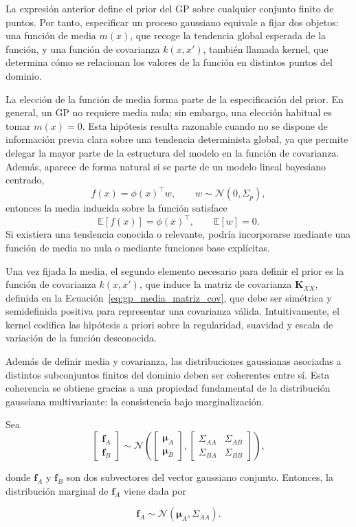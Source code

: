 \noindent La expresión anterior define el prior del GP sobre cualquier conjunto finito de
puntos. Por tanto, especificar un proceso gaussiano equivale a fijar dos objetos:
una función de media $m(x)$, que recoge la tendencia global esperada de la función,
y una función de covarianza $k(x,x')$, también llamada kernel, que determina cómo
se relacionan los valores de la función en distintos puntos del dominio.

La elección de la función de media forma parte de la especificación del prior. En general,
un GP no requiere media nula; sin embargo, una elección habitual es tomar $m(x)=0.$
Esta hipótesis resulta razonable cuando no se dispone de información previa clara
sobre una tendencia determinista global, ya que permite delegar la mayor parte de
la estructura del modelo en la función de covarianza. Además, aparece de forma
natural si se parte de un modelo lineal bayesiano centrado,
\[
f(x)=\phi(x)^\top w,
\qquad
w\sim\mathcal{N}(0,\Sigma_p),
\]
entonces la media inducida sobre la función satisface
\[
\mathbb{E}[f(x)] = \phi(x)^\top,
\qquad \mathbb{E}[w] = 0.
\]
Si existiera una tendencia conocida o relevante,
podría incorporarse mediante una función de media no nula o mediante funciones base
explícitas.

\medskip
\noindent Una vez fijada la media, el segundo elemento necesario para definir el prior es la
función de covarianza \(k(x,x')\), que induce la matriz de covarianza
\(\mathbf{K}_{XX}\), definida en la Ecuación~\eqref{eq:gp_media_matriz_cov}, que debe ser simétrica y semidefinida positiva para representar una covarianza válida. Intuitivamente, el kernel codifica las hipótesis a priori sobre la regularidad, suavidad y escala de variación de la función desconocida.

Además de definir media y covarianza, las distribuciones gaussianas asociadas a
distintos subconjuntos finitos del dominio deben ser coherentes entre sí. Esta
coherencia se obtiene gracias a una propiedad fundamental de la distribución
gaussiana multivariante: la consistencia bajo marginalización.

\begin{proposition}
\label{prop:marginalizacion_gaussiana}

Sea
\[
\begin{bmatrix}
\mathbf{f}_A\\
\mathbf{f}_B
\end{bmatrix}
\sim
\mathcal{N}\!\left(
\begin{bmatrix}
\boldsymbol{\mu}_A\\
\boldsymbol{\mu}_B
\end{bmatrix},
\begin{bmatrix}
\Sigma_{AA} & \Sigma_{AB}\\
\Sigma_{BA} & \Sigma_{BB}
\end{bmatrix}
\right),
\]

donde $\mathbf{f}_A$ y $\mathbf{f}_B$ son dos subvectores del vector gaussiano conjunto.
Entonces, la distribución marginal de $\mathbf{f}_A$ viene dada por

\[
\mathbf{f}_A \sim \mathcal{N}(\boldsymbol{\mu}_A,\Sigma_{AA}).
\]
\end{proposition}

